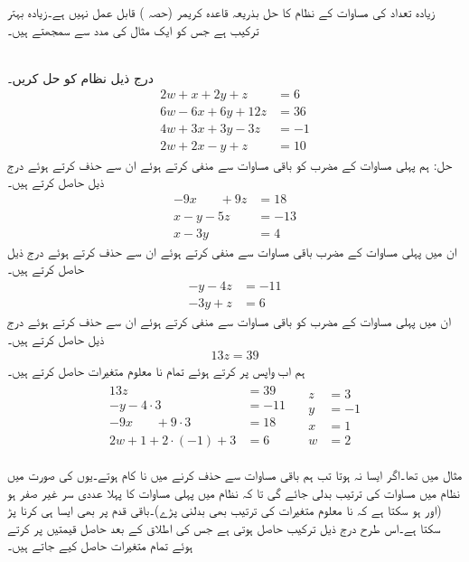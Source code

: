 زیادہ تعداد کی مساوات کے نظام کا حل بذریعہ قاعدہ کریمر (حصہ )  قابل عمل نہیں ہے۔زیادہ بہتر ترکیب  ہے جس کو ایک مثال کی مدد سے سمجھتے ہیں۔

\quad {}\\
درج ذیل نظام کو حل کریں۔
\begin{align*}
2w+x+2y+z&=6\\
6w-6x+6y+12z&=36\\
4w+3x+3y-3z&=-1\\
2w+2x-y+z&=10
\end{align*}
حل:\quad
{} ہم پہلی مساوات کے  مضرب  کو باقی مساوات سے منفی کرتے ہوئے ان سے  حذف کرتے ہوئے درج ذیل حاصل کرتے ہیں۔
\begin{align*}
-9x\phantom{+4y}+9z&=18\\
x-y-5z&=-13\\
x-3y\phantom{+4z}&=4
\end{align*}
 ان میں پہلی مساوات کے مضرب باقی مساوات سے منفی کرتے ہوئے ان سے  حذف کرتے ہوئے درج ذیل حاصل کرتے ہیں۔
\begin{align*}
-y-4z&=-11\\
-3y+z&=6
\end{align*}
 ان میں پہلی مساوات کے مضرب کو باقی مساوات سے منفی کرتے ہوئے ان سے  حذف کرتے ہوئے درج ذیل حاصل کرتے ہیں۔
\begin{align*}
13z=39
\end{align*}
 ہم اب واپس پر کرتے ہوئے تمام نا معلوم متغیرات حاصل کرتے ہیں۔
\begin{gather}
\begin{aligned}
13z&=39\\
-y-4\cdot3&=-11\\
-9x\phantom{+4y}+9\cdot 3&=18\\
2w+1+2\cdot(-1)+3&=6
\end{aligned}
\quad 
\begin{aligned}
z&=3\\
y&=-1\\
x&=1\\
w&=2
\end{aligned}
\end{gather} 

مثال  میں  تھا۔اگر ایسا نہ ہوتا تب ہم باقی مساوات سے  حذف کرنے میں نا کام ہوتے۔یوں  کی صورت میں نظام میں مساوات کی ترتیب بدلی جائے گی  تا کہ نظام میں پہلی مساوات کا پہلا عددی سر غیر صفر ہو (اور ہو سکتا ہے کہ نا معلوم متغیرات کی ترتیب بھی بدلنی پڑے)۔باقی قدم پر بھی ایسا ہی کرنا پڑ سکتا ہے۔اس طرح درج ذیل ترکیب حاصل ہوتی ہے جس کی اطلاق کے بعد حاصل قیمتیں پر کرتے ہوئے تمام متغیرات حاصل کیے جاتے ہیں۔


